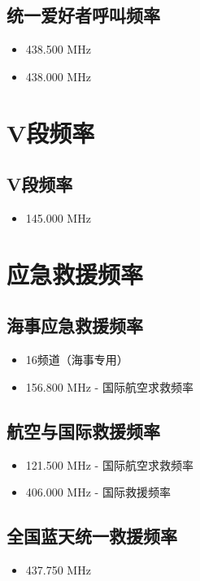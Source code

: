 \documentclass{ctexbook}
\begin{document}
\subsection{统一爱好者呼叫频率}
\begin{itemize}
    \item 438.500 MHz
    \item 438.000 MHz
\end{itemize}

\section{V段频率}

\subsection{V段频率}
\begin{itemize}
    \item 145.000 MHz
\end{itemize}

\section{应急救援频率}

\subsection{海事应急救援频率}
\begin{itemize}
    \item 16频道（海事专用）
    \item 156.800 MHz - 国际航空求救频率
\end{itemize}

\subsection{航空与国际救援频率}
\begin{itemize}
    \item 121.500 MHz - 国际航空求救频率
    \item 406.000 MHz - 国际救援频率
\end{itemize}

\subsection{全国蓝天统一救援频率}
\begin{itemize}
    \item 437.750 MHz
\end{itemize}

\backmatter
\end{document}

